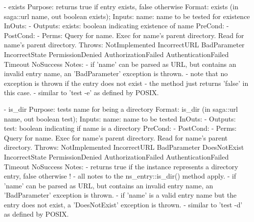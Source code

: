 \begin{myspec}
 
    - exists
      Purpose:  returns true if entry exists, false otherwise
      Format:   exists             (in  saga::url name,
                                    out boolean  exists);
      Inputs:   name:               name to be tested for
                                    existence
      InOuts:   -
      Outputs:  exists:             boolean indicating existence
                                    of name
      PreCond:  -
      PostCond: -
      Perms:    Query for name.
                Exec  for name's parent directory.
                Read  for name's parent directory.
      Throws:   NotImplemented
                IncorrectURL
                BadParameter
                IncorrectState
                PermissionDenied
                AuthorizationFailed
                AuthenticationFailed
                Timeout
                NoSuccess
      Notes:    - if 'name' can be parsed as URL, but contains 
                  an invalid entry name, an 'BadParameter'
                  exception is thrown.
                - note that no exception is thrown if the entry
                  does not exist - the method just returns
                  'false' in this case.
                - similar to 'test -e' as defined by POSIX.
 
 
    - is_dir
      Purpose:  tests name for being a directory
      Format:   is_dir             (in  saga::url name,
                                    out boolean test);
      Inputs:   name:               name to be tested
      InOuts:   -
      Outputs:  test:               boolean indicating if name
                                    is a directory
      PreCond:  -
      PostCond: -
      Perms:    Query for name.
                Exec  for name's parent directory.
                Read  for name's parent directory.
      Throws:   NotImplemented
                IncorrectURL
                BadParameter
                DoesNotExist
                IncorrectState
                PermissionDenied
                AuthorizationFailed
                AuthenticationFailed
                Timeout
                NoSuccess
      Notes:    - returns true if the instance represents
                  a directory entry, false otherwise
!               - all notes to the ns_entry::is_dir() method 
                  apply.
                - if 'name' can be parsed as URL, but contains 
                  an invalid entry name, an 'BadParameter'
                  exception is thrown.
                - if 'name' is a valid entry name but the entry
                  does not exist, a 'DoesNotExist' exception is
                  thrown.
                - similar to 'test -d' as defined by POSIX.
 

\end{myspec}
